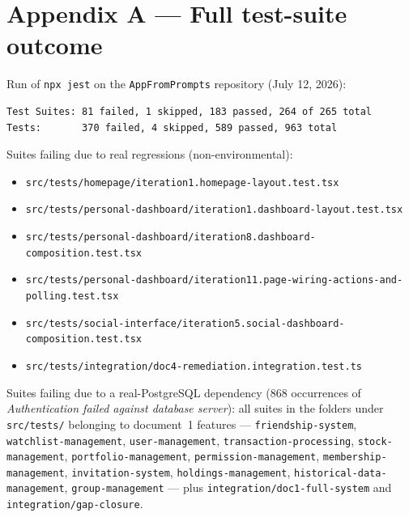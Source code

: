 \documentclass[11pt,a4paper]{article}
\newcommand{\file}[1]{\texttt{\small #1}}
\begin{document}
\appendix
\newpage

\section{Appendix A --- Full test-suite outcome}

Run of \file{npx jest} on the \file{AppFromPrompts} repository (July 12, 2026):

\begin{verbatim}
Test Suites: 81 failed, 1 skipped, 183 passed, 264 of 265 total
Tests:       370 failed, 4 skipped, 589 passed, 963 total
\end{verbatim}

Suites failing due to real regressions (non-environmental):

\begin{itemize}[leftmargin=1.5em,itemsep=1pt]
  \item \file{src/tests/homepage/iteration1.homepage-layout.test.tsx}
  \item \file{src/tests/personal-dashboard/iteration1.dashboard-layout.test.tsx}
  \item \file{src/tests/personal-dashboard/iteration8.dashboard-composition.test.tsx}
  \item \file{src/tests/personal-dashboard/iteration11.page-wiring-actions-and-polling.test.tsx}
  \item \file{src/tests/social-interface/iteration5.social-dashboard-composition.test.tsx}
  \item \file{src/tests/integration/doc4-remediation.integration.test.ts}
\end{itemize}

\begin{sloppypar}
Suites failing due to a real-PostgreSQL dependency (868 occurrences of \emph{Authentication failed against database server}): all suites in the folders under \file{src/tests/} belonging to document~1 features --- \file{friendship-system}, \file{watchlist-management}, \file{user-management}, \file{transaction-processing}, \file{stock-management}, \file{portfolio-management}, \file{permission-management}, \file{membership-management}, \file{invitation-system}, \file{holdings-management}, \file{historical-data-management}, \file{group-management} --- plus \file{integration/doc1-full-system} and \file{integration/gap-closure}.
\end{sloppypar}
\end{document}
